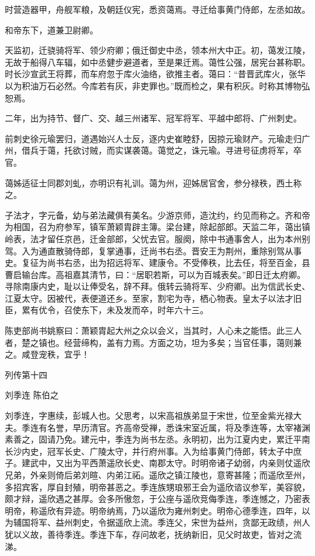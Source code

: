 \documentclass[12pt,UTF8]{ctexbook}
\begin{document}
时营造器甲，舟舰军粮，及朝廷仪宪，悉资蔼焉。寻迁给事黄门侍郎，左丞如故。

和帝东下，道兼卫尉卿。

天监初，迁骁骑将军、领少府卿；俄迁御史中丞，领本州大中正。初，蔼发江陵，无故于船得八车辐，如中丞健步避道者，至是果迁焉。蔼性公强，居宪台甚称职。时长沙宣武王将葬，而车府忽于库火油络，欲推主者。蔼曰：“昔晋武库火，张华以为积油万石必然。今库若有灰，非吏罪也。”既而检之，果有积灰。时称其博物弘恕焉。

二年，出为持节、督广、交、越三州诸军、冠军将军、平越中郎将、广州刺史。

前刺史徐元瑜罢归，道遇始兴人士反，逐内史崔睦舒，因掠元瑜财产。元瑜走归广州，借兵于蔼，托欲讨贼，而实谋袭蔼。蔼觉之，诛元瑜。寻进号征虏将军，卒官。

蔼姊适征士同郡刘虬，亦明识有礼训。蔼为州，迎姊居官舍，参分禄秩，西土称之。

子法才，字元备，幼与弟法藏俱有美名。少游京师，造沈约，约见而称之。齐和帝为相国，召为府参军，镇军萧颖胄辟主簿。梁台建，除起部郎。天监二年，蔼出镇岭表，法才留任京邑，迁金部郎，父忧去官。服阕，除中书通事舍人，出为本州别驾。入为通直散骑侍郎，复掌通事，迁尚书右丞。晋安王为荆州，重除别驾从事史。复征为尚书右丞，出为招远将军、建康令。不受俸秩，比去任，将至百金，县曹启输台库。高祖嘉其清节，曰：“居职若斯，可以为百城表矣。”即日迁太府卿。寻除南康内史，耻以让俸受名，辞不拜。俄转云骑将军、少府卿。出为信武长史、江夏太守。因被代，表便道还乡。至家，割宅为寺，栖心物表。皇太子以法才旧臣，累有优令，召使东下，未及发而卒，时年六十三。

陈吏部尚书姚察曰：萧颖胄起大州之众以会义，当其时，人心未之能悟。此三人者，楚之镇也。经营缔构，盖有力焉。方面之功，坦为多矣；当官任事，蔼则兼之。咸登宠秩，宜乎！





列传第十四

刘季连 陈伯之

刘季连，字惠续，彭城人也。父思考，以宋高祖族弟显于宋世，位至金紫光禄大夫。季连有名誉，早历清官。齐高帝受禅，悉诛宋室近属，将及季连等，太宰褚渊素善之，固请乃免。建元中，季连为尚书左丞。永明初，出为江夏内史，累迁平南长沙内史，冠军长史、广陵太守，并行府州事。入为给事黄门侍郎，转太子中庶子。建武中，又出为平西萧遥欣长史、南郡太守。时明帝诸子幼弱，内亲则仗遥欣兄弟，外亲则倚后弟刘暄、内弟江祏。遥欣之镇江陵也，意寄甚隆；而遥欣至州，多招宾客，厚自封殖，明帝甚恶之。季连族甥琅邪王会为遥欣谘议参军，美容貌，颇才辩，遥欣遇之甚厚。会多所慠忽，于公座与遥欣竞侮季连，季连憾之，乃密表明帝，称遥欣有异迹。明帝纳焉，乃以遥欣为雍州刺史。明帝心德季连，四年，以为辅国将军、益州刺史，令据遥欣上流。季连父，宋世为益州，贪鄙无政绩，州人犹以义故，善待季连。季连下车，存问故老，抚纳新旧，见父时故吏，皆对之流涕。
\end{document}
